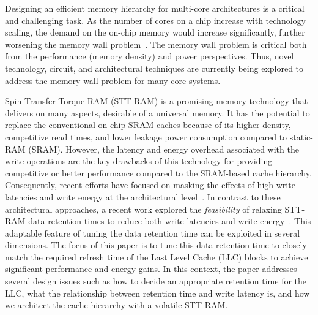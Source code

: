 
Designing an efficient memory hierarchy for multi-core architectures is a critical and challenging
task. As the number of cores on a chip increase with technology scaling, the demand on the on-chip
memory would increase significantly, further worsening the memory wall problem~\cite{BurgerGK96}. The
memory wall problem is critical both from the performance (memory density) and power perspectives.
Thus, novel technology, circuit, and architectural techniques are currently being explored to address
the memory wall problem for many-core systems.





Spin-Transfer Torque RAM (STT-RAM) is a promising memory technology that delivers on many aspects,
desirable of a universal memory. It has the potential to replace the conventional on-chip SRAM
caches because of its higher density, competitive read times, and lower leakage power consumption
compared to static-RAM (SRAM). However, the latency and energy overhead associated with the write operations are the key drawbacks
of this technology for providing competitive or better performance compared to the SRAM-based cache
hierarchy. Consequently, recent efforts have focused on masking the effects of high write latencies
and write energy at the architectural level~\cite{mram-energy-reduction,gsun-hpca}. In contrast to
these architectural approaches, a recent  work explored the {\it feasibility} of relaxing STT-RAM
data retention times to reduce both write latencies and write energy~\cite{STTRAM:HPCA11}. This
adaptable feature of tuning the data retention time can be exploited in several dimensions. The focus
of this paper is to tune this data retention time to closely match the required refresh time of the Last
Level Cache (LLC) blocks to achieve significant performance and energy gains. In this context, the paper
addresses several design issues such as how to decide an appropriate retention time for the LLC,
what the relationship between retention time and write latency is, and how we
architect the cache hierarchy with a volatile STT-RAM.


